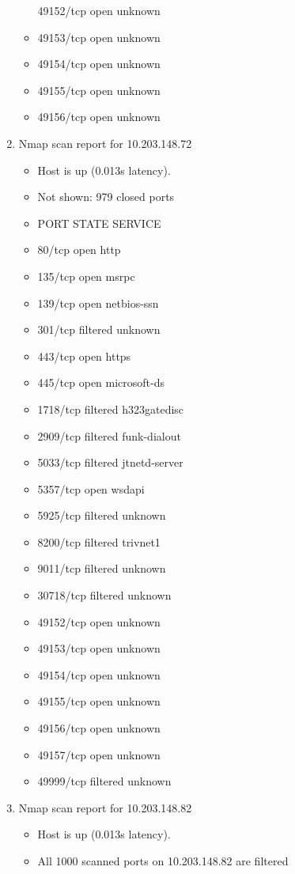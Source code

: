 \documentclass[12pt]{article}
\begin{document}
\begin{enumerate}
\begin{itemize}
49152/tcp open     unknown\item 
49153/tcp open     unknown\item 
49154/tcp open     unknown\item 
49155/tcp open     unknown\item 
49156/tcp open     unknown
\end{itemize}

\item Nmap scan report for 10.203.148.72
\begin{itemize}\item 
Host is up (0.013s latency).\item 
Not shown: 979 closed ports\item 
PORT      STATE    SERVICE\item 
80/tcp    open     http\item 
135/tcp   open     msrpc\item 
139/tcp   open     netbios-ssn\item 
301/tcp   filtered unknown\item 
443/tcp   open     https\item 
445/tcp   open     microsoft-ds\item 
1718/tcp  filtered h323gatedisc\item 
2909/tcp  filtered funk-dialout\item 
5033/tcp  filtered jtnetd-server\item 
5357/tcp  open     wsdapi\item 
5925/tcp  filtered unknown\item 
8200/tcp  filtered trivnet1\item 
9011/tcp  filtered unknown\item 
30718/tcp filtered unknown\item 
49152/tcp open     unknown\item 
49153/tcp open     unknown\item 
49154/tcp open     unknown\item 
49155/tcp open     unknown\item 
49156/tcp open     unknown\item 
49157/tcp open     unknown\item 
49999/tcp filtered unknown
\end{itemize}

\item Nmap scan report for 10.203.148.82
\begin{itemize}\item 
Host is up (0.013s latency).\item 
All 1000 scanned ports on 10.203.148.82 are filtered
\end{itemize}


\end{enumerate}
\end{document}
